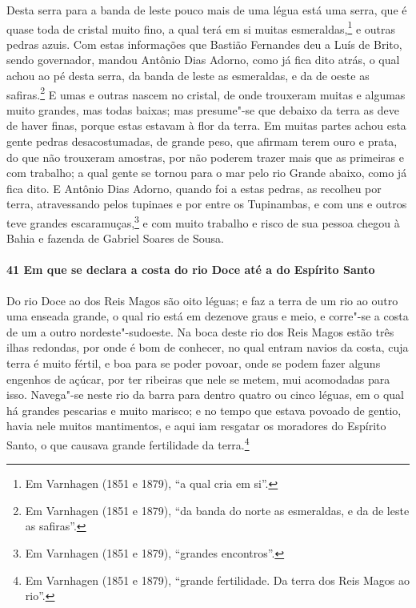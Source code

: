 \begin{linenumbers}
Desta serra para a banda de leste pouco mais de uma légua está uma serra, que é quase toda
de cristal muito fino, a qual terá em si muitas esmeraldas,\footnote{ Em Varnhagen (1851 e
1879), ``a qual cria em si''.} e outras pedras azuis. Com estas informações que Bastião
Fernandes deu a Luís de Brito, sendo governador, mandou Antônio Dias Adorno, como já fica
dito atrás, o qual achou ao pé desta serra, da banda de leste as esmeraldas, e da de oeste
as safiras.\footnote{ Em Varnhagen (1851 e 1879), ``da banda do norte as esmeraldas, e da
de leste as safiras''.} E umas e outras nascem no cristal, de onde trouxeram muitas e
algumas muito grandes, mas todas baixas; mas presume"-se que debaixo da terra as deve de
haver finas, porque estas estavam à flor da terra. Em muitas partes achou esta gente
pedras desacostumadas, de grande peso, que afirmam terem ouro e prata, do que não
trouxeram amostras, por não poderem trazer mais que as primeiras e com trabalho; a qual
gente se tornou para o mar pelo rio Grande abaixo, como já fica dito. E Antônio Dias
Adorno, quando foi a estas pedras, as recolheu por terra, atravessando pelos tupinaes e
por entre os Tupinambas, e com uns e outros teve grandes escaramuças,\footnote{ Em
Varnhagen (1851 e 1879), ``grandes encontros''.} e com muito trabalho e risco de sua
pessoa chegou à Bahia e fazenda de Gabriel Soares de Sousa.

\paragraph{41 Em que se declara a costa do rio Doce até a do Espírito Santo} \quad
Do rio Doce ao dos Reis Magos são oito léguas; e faz a terra de um rio ao outro uma
enseada grande, o qual rio está em dezenove graus e meio, e corre"-se a costa de um a outro
nordeste"-sudoeste. Na boca deste rio dos Reis Magos estão três ilhas redondas, por onde é
bom de conhecer, no qual entram navios da costa, cuja terra é muito fértil, e boa para se
poder povoar, onde se podem fazer alguns engenhos de açúcar, por ter ribeiras que nele se
metem, mui acomodadas para isso. Navega"-se neste rio da barra para dentro quatro ou cinco
léguas, em o qual há grandes pescarias e muito marisco; e no tempo que estava povoado de
gentio, havia nele muitos mantimentos, e aqui iam resgatar os moradores do Espírito Santo,
o que causava grande fertilidade da terra.\footnote{ Em Varnhagen (1851 e 1879), ``grande
fertilidade. Da terra dos Reis Magos ao rio''.}


\end{linenumbers}

